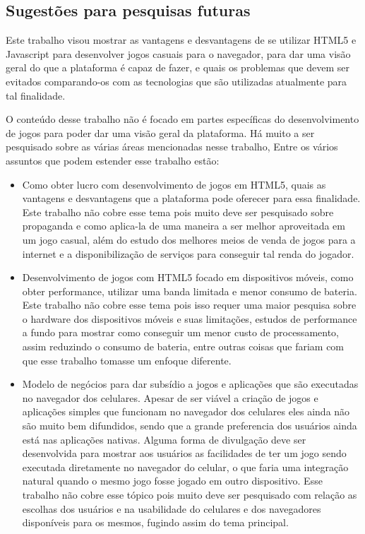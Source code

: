 \subsection{Sugestões para pesquisas futuras}

Este trabalho visou mostrar as vantagens e desvantagens de se utilizar
HTML5 e Javascript para desenvolver jogos casuais para o navegador,
para dar uma visão geral do que a plataforma é capaz de fazer, e quais
os problemas que devem ser evitados comparando-os com as tecnologias
que são utilizadas atualmente para tal finalidade.

O conteúdo desse trabalho não é focado em partes específicas do
desenvolvimento de jogos para poder dar uma visão geral da plataforma.
Há muito a ser pesquisado sobre as várias áreas mencionadas nesse
trabalho, Entre os vários assuntos que podem estender esse trabalho
estão:

\begin{itemize}
    \item Como obter lucro com desenvolvimento de jogos em HTML5, quais as vantagens
    e desvantagens que a plataforma pode oferecer para essa
    finalidade. Este trabalho não cobre esse tema pois muito deve ser
    pesquisado sobre propaganda e como aplica-la de uma maneira a ser
    melhor aproveitada em um jogo casual, além do estudo dos melhores
    meios de venda de jogos para a internet e a disponibilização de
    serviços para conseguir tal renda do jogador.

    \item Desenvolvimento de jogos com HTML5 focado em dispositivos móveis, como
    obter performance, utilizar uma banda limitada e menor consumo de
    bateria. Este trabalho não cobre esse tema pois isso requer uma maior
    pesquisa sobre o hardware dos dispositivos móveis e suas limitações,
    estudos de performance a fundo para mostrar como conseguir um menor
    custo de processamento, assim reduzindo o consumo de bateria, entre
    outras coisas que fariam com que esse trabalho tomasse um enfoque
    diferente.

    \item Modelo de negócios para dar subsídio a jogos e aplicações
    que são executadas no navegador dos celulares. Apesar de ser viável
    a criação de jogos e aplicações simples que funcionam no navegador
    dos celulares eles ainda não são muito bem difundidos, sendo que a
    grande preferencia dos usuários ainda está nas aplicações nativas.
    Alguma forma de divulgação deve ser desenvolvida para mostrar aos
    usuários as facilidades de ter um jogo sendo executada diretamente
    no navegador do celular, o que faria uma integração natural quando
    o mesmo jogo fosse jogado em outro dispositivo. Esse trabalho não
    cobre esse tópico pois muito deve ser pesquisado com relação as
    escolhas dos usuários e na usabilidade do celulares e dos
    navegadores disponíveis para os mesmos, fugindo assim do tema
    principal.
\end{itemize}
